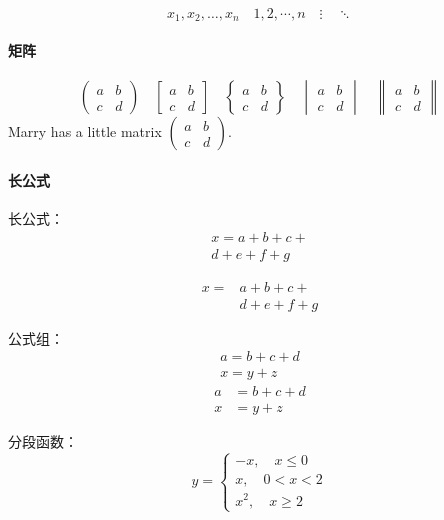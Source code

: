 \documentclass{article}
\begin{document}
\[ x_1,x_2,\dots ,x_n\quad 1,2,\cdots ,n\quad  %
\vdots\quad \ddots \]

\paragraph{矩阵}
\[ \begin{pmatrix} a&b\\c&d \end{pmatrix} \quad  %
\begin{bmatrix} a&b\\c&d \end{bmatrix} \quad     %
\begin{Bmatrix} a&b\\c&d \end{Bmatrix} \quad     %
\begin{vmatrix} a&b\\c&d \end{vmatrix} \quad     %
\begin{Vmatrix} a&b\\c&d \end{Vmatrix} \]        %
Marry has a little matrix $ ( \begin{smallmatrix} a&b\\c&d \end{smallmatrix} ) $.   %

\paragraph{长公式}长公式：
\begin{multline}
    x = a+b+c+{} \\
    d+e+f+g
\end{multline}  %

\[\begin{aligned}
    x ={}& a+b+c+{} \\
    &d+e+f+g
    \end{aligned} \]

公式组：
\begin{gather}
    a = b+c+d \\
    x = y+z
    \end{gather}
    \begin{align}
    a &= b+c+d \\
    x &= y+z
    \end{align}

分段函数：
\[ y= \begin{cases}
    -x,\quad x\leq 0 \\
    x,\quad 0<x<2 \\
    x^2,\quad x\ge 2
    \end{cases} \]
\end{document}
